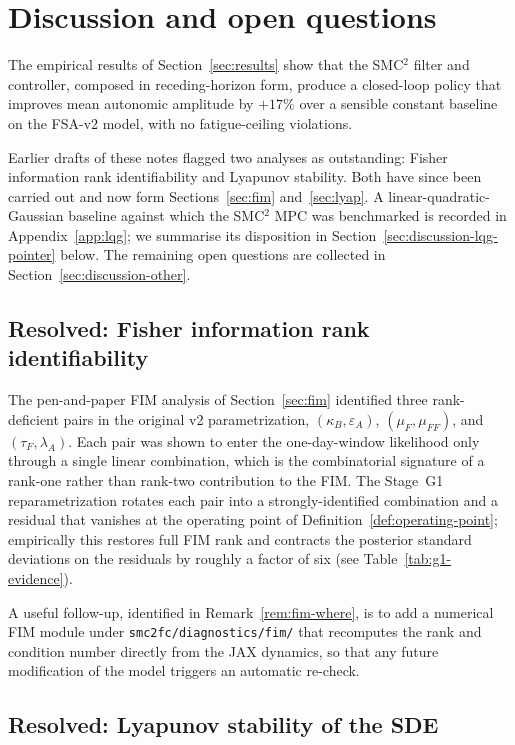 \section{Discussion and open questions}\label{sec:discussion}

The empirical results of Section~\ref{sec:results} show that the
SMC${}^2$ filter and controller, composed in receding-horizon form,
produce a closed-loop policy that improves mean autonomic amplitude by
$+17\%$ over a sensible constant baseline on the FSA-v2 model, with no
fatigue-ceiling violations.

Earlier drafts of these notes flagged two analyses as outstanding:
Fisher information rank identifiability and Lyapunov stability. Both
have since been carried out and now form Sections~\ref{sec:fim}
and~\ref{sec:lyap}. A linear-quadratic-Gaussian baseline against
which the SMC${}^2$ MPC was benchmarked is recorded in
Appendix~\ref{app:lqg}; we summarise its disposition in
Section~\ref{sec:discussion-lqg-pointer} below. The remaining open
questions are collected in Section~\ref{sec:discussion-other}.

\subsection{Resolved: Fisher information rank
identifiability}\label{sec:discussion-fim}

The pen-and-paper FIM analysis of Section~\ref{sec:fim} identified
three rank-deficient pairs in the original v2 parametrization,
$(\kappa_B,\varepsilon_A)$, $(\mu_F,\mu_{FF})$, and
$(\tau_F,\lambda_A)$. Each pair was shown to enter the one-day-window
likelihood only through a single linear combination, which is the
combinatorial signature of a rank-one rather than rank-two contribution
to the FIM. The Stage~G1 reparametrization rotates each pair into a
strongly-identified combination and a residual that vanishes at the
operating point of Definition~\ref{def:operating-point}; empirically
this restores full FIM rank and contracts the posterior standard
deviations on the residuals by roughly a factor of six (see
Table~\ref{tab:g1-evidence}).

A useful follow-up, identified in Remark~\ref{rem:fim-where}, is to
add a numerical FIM module under
\texttt{smc2fc/diagnostics/fim/} that recomputes the rank and
condition number directly from the JAX dynamics, so that any future
modification of the model triggers an automatic re-check.

\subsection{Resolved: Lyapunov stability of the
SDE}\label{sec:discussion-lyap}

